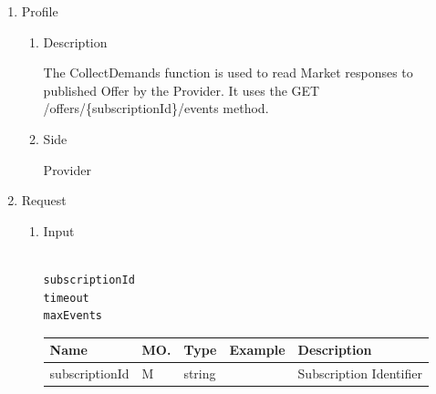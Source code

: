 \newpage


\begin{enumerate}

\item Profile

\begin{enumerate}

\item Description

The CollectDemands function is used to read Market responses to published Offer by the Provider. 
It uses the GET /offers/\{subscriptionId\}/events method.

\item Side

Provider

\end{enumerate}

\item Request

\begin{enumerate}

\item Input

\begin{tcolorbox}[boxrule=0pt, frame empty]
\begin{verbatim}

subscriptionId
timeout
maxEvents

\end{verbatim}
\end{tcolorbox}


\begin{table}[H]
\footnotesize

\begin{center}
\begin{tabular}{|p{3cm}|l|p{3cm}|p{3cm}|p{4cm}|} 
\hline
\rowcolor{lightgray}	Name	& MO.	& Type	& Example & 	Description \\
\hline

subscriptionId	& M	& 	string			&		&	Subscription Identifier \\ 

\hline


\end{tabular}
\end{center}
\end{table}
\end{enumerate}
\end{enumerate}
